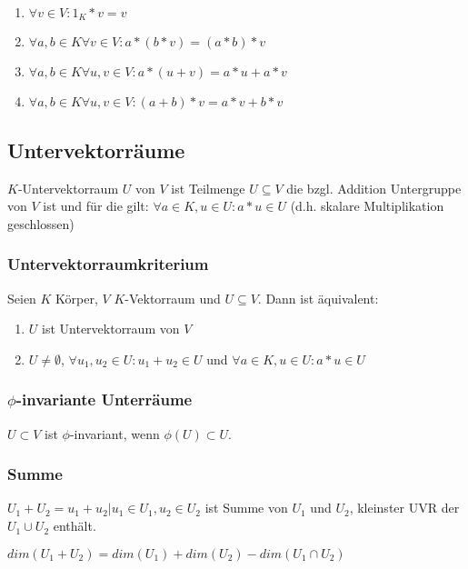 \begin{enumerate}[label=(\alph*)]
	\item $\forall v \in V : 1_K * v = v$
	\item $\forall a, b \in K \forall v \in V : a*(b*v)=(a*b)*v$
	\item $\forall a, b \in K \forall u, v \in V : a*(u+v)=a*u+a*v$
	\item $\forall a, b \in K \forall u, v \in V : (a+b)*v=a*v+b*v$
\end{enumerate}

\subsection*{Untervektorräume}

$K$-Untervektorraum $U$ von $V$ ist Teilmenge $U \subseteq V$ die bzgl. Addition Untergruppe von $V$ ist und für die gilt: $\forall a \in K, u \in U : a*u \in U$ (d.h. skalare Multiplikation geschlossen)

\subsubsection*{Untervektorraumkriterium}

Seien $K$ Körper, $V$ $K$-Vektorraum und $U \subseteq V$. Dann ist äquivalent:

\begin{enumerate}[label=(\alph*)]
	\item $U$ ist Untervektorraum von $V$
	\item $U \neq \emptyset$, $\forall u_1, u_2 \in U : u_1 + u_2 \in U$ und $\forall a \in K, u \in U : a*u \in U$
\end{enumerate}

\subsubsection*{$\phi$-invariante Unterräume}

$U \subset V$ ist $\phi$-invariant, wenn $\phi(U) \subset U$.

\subsubsection*{Summe}

$U_1 + U_2 = {u_1+u_2 | u_1 \in U_1, u_2 \in U_2 }$ ist Summe von $U_1$ und $U_2$, kleinster UVR der $U_1 \cup U_2$ enthält.

$dim(U_1 + U_2) = dim(U_1) + dim(U_2) - dim(U_1 \cap U_2)$

